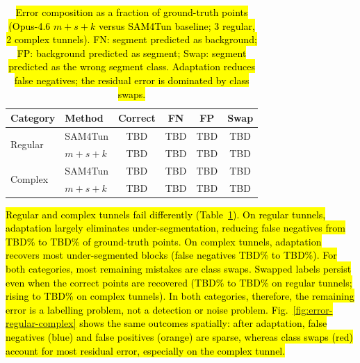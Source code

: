 \documentclass[a4paper,fleqn]{cas-dc}
\begin{document}
{\begin{table}[ht]
\caption{\hl{Error composition as a fraction of ground-truth points (Opus-4.6 \mbox{$m+s+k$} versus SAM4Tun baseline; 3 regular, 2 complex tunnels). FN: segment predicted as background; FP: background predicted as segment; Swap: segment predicted as the wrong segment class. Adaptation reduces false negatives; the residual error is dominated by class swaps.}}\label{tab:error-composition}
\begin{tabular*}{\tblwidth}{@{} l l c c c c @{}}
\toprule
Category & Method & Correct & FN & FP & Swap \\
\midrule
\multirow{2}{*}{Regular}
  & SAM4Tun     & TBD & TBD & TBD & TBD \\
  & \mbox{$m+s+k$} & TBD & TBD  & TBD & TBD \\
\midrule
\multirow{2}{*}{Complex}
  & SAM4Tun     & TBD & TBD & TBD & TBD  \\
  & \mbox{$m+s+k$} & TBD & TBD & TBD & TBD \\
\bottomrule
\end{tabular*}
\end{table}

\hl{Regular and complex tunnels fail differently (Table~\ref{tab:error-composition}). On regular tunnels, adaptation largely eliminates under-segmentation, reducing false negatives from TBD\% to TBD\% of ground-truth points. On complex tunnels, adaptation recovers most under-segmented blocks (false negatives TBD\% to TBD\%). For both categories, most remaining mistakes are class swaps. Swapped labels persist even when the correct points are recovered (TBD\% to TBD\% on regular tunnels; rising to TBD\% on complex tunnels). In both categories, therefore, the remaining error is a labelling problem, not a detection or noise problem. Fig.~\ref{fig:error-regular-complex} shows the same outcomes spatially: after adaptation, false negatives (blue) and false positives (orange) are sparse, whereas class swaps (red) account for most residual error, especially on the complex tunnel.}

}
\end{document}
